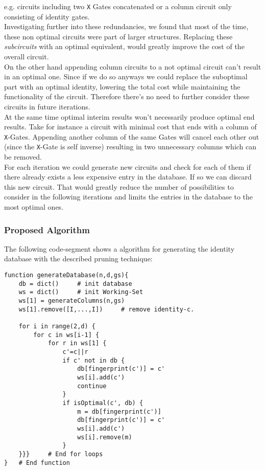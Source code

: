 e.g. circuits including two \texttt{X} Gates concatenated or a column circuit only consisting of identity gates. \\

Investigating further into these redundancies, we found that most of the time, these non optimal circuits were part of larger structures. Replacing these \textit{subcircuits} with an optimal equivalent, would greatly improve the cost of the overall circuit. \\

On the other hand appending column circuits to a not optimal circuit can't result in an optimal one. Since if we do so anyways we could replace the suboptimal part with an optimal identity, lowering the total cost while maintaining the functionality of the circuit. Therefore there's no need to further consider these circuits in future iterations.\\

At the same time optimal interim results won't necessarily produce optimal end results. Take for instance a circuit with minimal cost that ends with a column of \texttt{X}-Gates. Appending another column of the same Gates will cancel each other out (since the \texttt{X}-Gate is self inverse) resulting in two unnecessary columns which can be removed.\\

For each iteration we could generate new circuits and check for each of them if there already exists a less expensive entry in the database. If so we can discard this new circuit. That would greatly reduce the number of possibilities to consider in the following iterations and limits the entries in the database to the most optimal ones.

\subsubsection{Proposed Algorithm}

The following code-segment shows a algorithm for generating the identity database with the described pruning technique:

\begin{verbatim}
function generateDatabase(n,d,gs){
	db = dict() 	# init database
	ws = dict() 	# init Working-Set
	ws[1] = generateColumns(n,gs)
	ws[1].remove([I,...,I]) 	# remove identity-c.
	
	for i in range(2,d) {
		for c in ws[i-1] {
			for r in ws[1] {
				c'=c||r
				if c' not in db {
					db[fingerprint(c')] = c'
					ws[i].add(c')
					continue
				}
				if isOptimal(c', db) {
					m = db[fingerprint(c')]
					db[fingerprint(c')] = c'	
					ws[i].add(c')
					ws[i].remove(m)
				}
	}}} 	# End for loops
} 	# End function
\end{verbatim}

